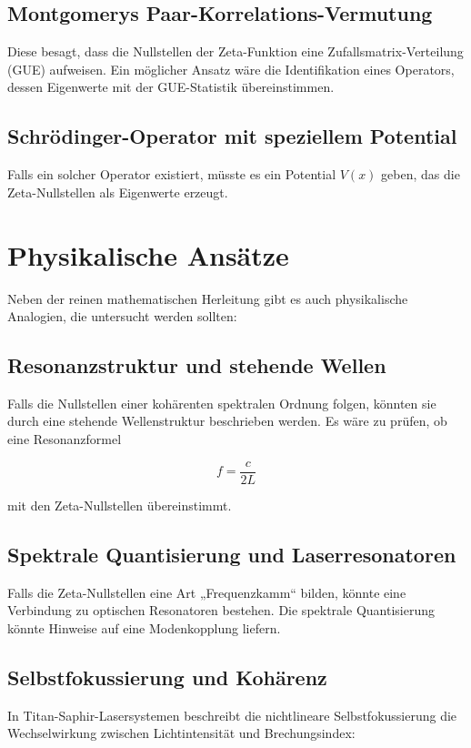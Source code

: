 \documentclass[a4paper,12pt]{article}
\begin{document}
\subsection{Montgomerys Paar-Korrelations-Vermutung}
Diese besagt, dass die Nullstellen der Zeta-Funktion eine Zufallsmatrix-Verteilung (GUE) aufweisen. Ein möglicher Ansatz wäre die Identifikation eines Operators, dessen Eigenwerte mit der GUE-Statistik übereinstimmen.

\subsection{Schrödinger-Operator mit speziellem Potential}
Falls ein solcher Operator existiert, müsste es ein Potential \(V(x)\) geben, das die Zeta-Nullstellen als Eigenwerte erzeugt.

\section{Physikalische Ansätze}
Neben der reinen mathematischen Herleitung gibt es auch physikalische Analogien, die untersucht werden sollten:

\subsection{Resonanzstruktur und stehende Wellen}
Falls die Nullstellen einer kohärenten spektralen Ordnung folgen, könnten sie durch eine stehende Wellenstruktur beschrieben werden. Es wäre zu prüfen, ob eine Resonanzformel

\begin{equation}
f = \frac{c}{2L}
\end{equation}

mit den Zeta-Nullstellen übereinstimmt.

\subsection{Spektrale Quantisierung und Laserresonatoren}
Falls die Zeta-Nullstellen eine Art „Frequenzkamm“ bilden, könnte eine Verbindung zu optischen Resonatoren bestehen. Die spektrale Quantisierung könnte Hinweise auf eine Modenkopplung liefern.

\subsection{Selbstfokussierung und Kohärenz}
In Titan-Saphir-Lasersystemen beschreibt die nichtlineare Selbstfokussierung die Wechselwirkung zwischen Lichtintensität und Brechungsindex:
\end{document}
